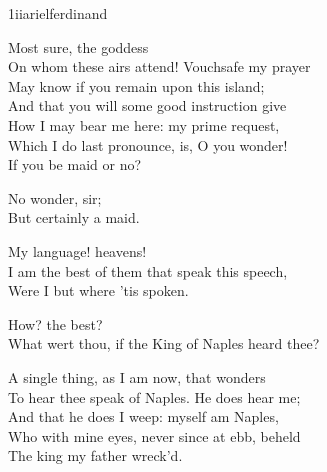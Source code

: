 \begin{pictures} %
	\begin{bwbigpic}
		[\picwidth]
		{1iiarielferdinand}
		{}
	\end{bwbigpic}
\end{pictures}



\begin{verse_speech}[Ferdinand] 
Most sure, the goddess\\
On whom these airs attend! Vouchsafe my prayer\\
May know if you remain upon this island;\\
And that you will some good instruction give\\
How I may bear me here: my prime request,\\
Which I do last pronounce, is, O you wonder!\\
If you be maid or no?
\end{verse_speech}

\begin{verse_speech}[Miranda] 
No wonder, sir;\\
But certainly a maid.
\end{verse_speech}

\begin{verse_speech}[Ferdinand] 
My language! heavens!\\
I am the best of them that speak this speech,\\
Were I but where 'tis spoken.
\end{verse_speech}

\begin{verse_speech}[Prospero] 
How? the best?\\
What wert thou, if the King of Naples heard thee?
\end{verse_speech}

\begin{verse_speech}[Ferdinand] 
A single thing, as I am now, that wonders\\
To hear thee speak of Naples. He does hear me;\\
And that he does I weep: myself am Naples,\\
Who with mine eyes, never since at ebb, beheld\\
The king my father wreck'd.
\end{verse_speech}

